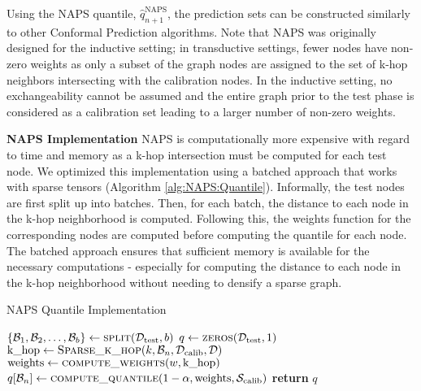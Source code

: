 Using the NAPS quantile, $\hat{q}^{\text{NAPS}}_{n+1}$, the prediction sets can be constructed similarly to other Conformal Prediction algorithms.
Note that NAPS was originally designed for the inductive setting; in transductive settings, fewer nodes have non-zero weights as only a subset of the graph nodes are assigned to the set of k-hop neighbors intersecting with the calibration nodes.
In the inductive setting, no exchangeability cannot be assumed and the entire graph prior to the test phase is considered as a calibration set leading to a larger number of non-zero weights.

\noindent \textbf{NAPS Implementation}
NAPS is computationally more expensive with regard to time and memory as a k-hop intersection must be computed for each test node.
We optimized this implementation using a batched approach that works with sparse tensors (Algorithm \ref{alg:NAPS:Quantile}).
Informally, the test nodes are first split up into batches. 
Then, for each batch, the distance to each node in the k-hop neighborhood is computed.
Following this, the weights function for the corresponding nodes are computed before computing the quantile for each node.
The batched approach ensures that sufficient memory is available for the necessary computations - especially for computing the distance to each node in the k-hop neighborhood without needing to densify a sparse graph.

\begin{algorithm}
\caption{NAPS Quantile Implementation}\label{alg:NAPS:Quantile}
\begin{algorithmic}[1]
    \State $\{\mathcal{B}_1,\mathcal{B}_2,\hdots,\mathcal{B}_b\}\gets \Call{\text{split}}{\test,b}$ 
    \State $q\gets \Call{\text{zeros}}{\test,1}$
        \State $\text{k\_hop} \gets \Call{\text{Sparse\_k\_hop}}{k,\mathcal{B}_n,\calib,\mathcal{D}}$
        \State $\text{weights}\gets \Call{\text{compute\_weights}}{w,\text{k\_hop}}$
        \State $q[\mathcal{B}_n]\gets \Call{\text{compute\_quantile}}{1-\alpha,\text{weights},\mathcal{S}_{\text{calib}}}$
    \EndFor\label{NAPSquantileendwhile}
    \State \textbf{return} $q$
\EndProcedure
\end{algorithmic}
\end{algorithm}

